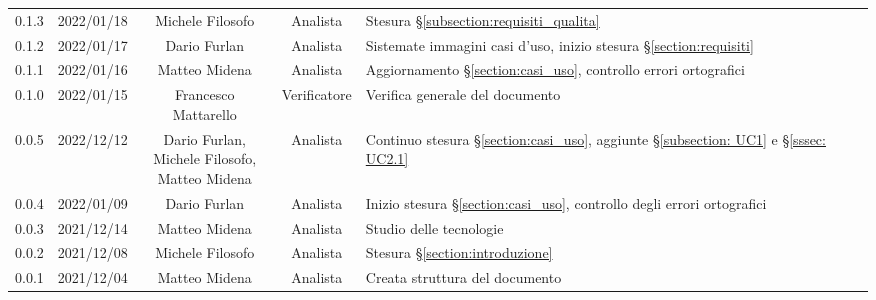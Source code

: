 \begin{center}
\begin{longtable}[c]{c | c | c | c | p{5cm}}
		0.1.3 & 2022/01/18 & Michele Filosofo & Analista & Stesura §\ref{subsection:requisiti_qualita} \\
		0.1.2 & 2022/01/17 & Dario Furlan & Analista & Sistemate immagini casi d'uso, inizio stesura §\ref{section:requisiti}\\
		0.1.1 & 2022/01/16 & Matteo Midena & Analista  & Aggiornamento §\ref{section:casi_uso}, controllo errori ortografici \\
		0.1.0 & 2022/01/15 & Francesco Mattarello & Verificatore & Verifica generale del documento\\
		0.0.5 & 2022/12/12 & \shortstack{Dario Furlan,\\ Michele Filosofo,\\ Matteo Midena} & Analista & Continuo stesura §\ref{section:casi_uso}, aggiunte §\ref{subsection: UC1}  e §\ref{sssec: UC2.1}\\
		0.0.4 & 2022/01/09 & Dario Furlan & Analista & Inizio stesura §\ref{section:casi_uso}, controllo degli errori ortografici \\
		0.0.3 & 2021/12/14 & Matteo Midena & Analista & Studio delle tecnologie\\
		0.0.2 & 2021/12/08 & Michele Filosofo & Analista & Stesura §\ref{section:introduzione}\\
		0.0.1 & 2021/12/04 & Matteo Midena & Analista & Creata struttura del documento\\
	\end{longtable}
\end{center}